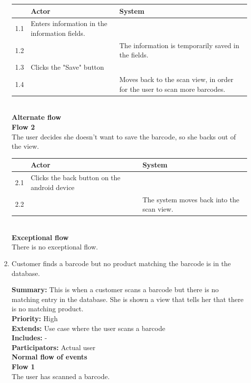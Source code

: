 \documentclass{report}
\begin{document}
\begin{enumerate}
    \begin{tabular}{ | l | p{4cm} | p{4cm} |}
    \hline
      & Actor & System \\ \hline
    1.1 & Enters information in the information fields. & \\ \hline
    1.2 & & The information is temporarily saved in the fields. \\ \hline
    1.3 & Clicks the "Save" button & \\ \hline
    1.4 & & Moves back to the scan view, in order for the user to scan more barcodes. \\
    \hline
    \end{tabular} \\

    \textbf{Alternate flow} \\
    \textbf{Flow 2} \\ The user decides she doesn't want to save the barcode, so she backs out of the view. \\

    \begin{tabular}{ | l | p{4cm} | p{4cm} |}
    \hline
      & Actor & System \\ \hline
    2.1 & Clicks the back button on the android device & \\
    2.2 & & The system moves back into the scan view. \\
    \hline
    \end{tabular} \\

    \textbf{Exceptional flow} \\ There is no exceptional flow.

\pagebreak

  \item Customer finds a barcode but no product matching the barcode is in the database. \

    \textbf{Summary:} This is when a customer scans a barcode but there is no matching entry in the database. She is shown a view that tells her that there is no matching product. \\
    \textbf{Priority:} High \\
    \textbf{Extends:} Use case where the user scans a barcode \\
    \textbf{Includes:} - \\
    \textbf{Participators:} Actual user \\
    \textbf{Normal flow of events} \\
    \textbf{Flow 1} \\ The user has scanned a barcode. \\


\end{enumerate}
\end{document}
